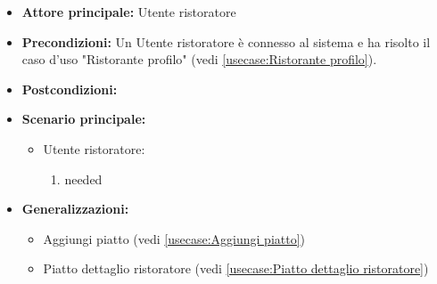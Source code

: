 \label{usecase:Ristorante menu ristoratore}
\begin{itemize}
\item \textbf{Attore principale:} Utente ristoratore
\item \textbf{Precondizioni:}
Un Utente ristoratore è connesso al sistema e ha risolto il caso d'uso "Ristorante profilo" (vedi \autoref{usecase:Ristorante profilo}).
\item \textbf{Postcondizioni:}
\item \textbf{Scenario principale:}
\begin{itemize}
\item Utente ristoratore:
\begin{enumerate}
\item needed
\end{enumerate}
\end{itemize}
\item \textbf{Generalizzazioni:}
\begin{itemize}
\item Aggiungi piatto (vedi \autoref{usecase:Aggiungi piatto})\item Piatto dettaglio ristoratore (vedi \autoref{usecase:Piatto dettaglio ristoratore})
\end{itemize}
\end{itemize}